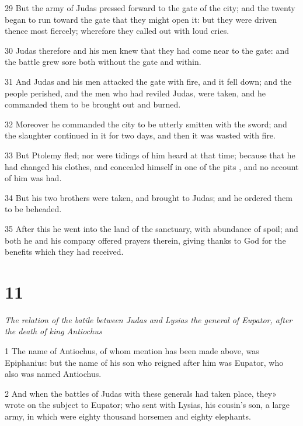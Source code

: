 \par 29 But the army of Judas pressed forward to the gate of the city; and the twenty began to run toward the gate that they might open it: but they were driven thence most fiercely; wherefore they called out with loud cries. 

\par 30 Judas therefore and his men knew that they had come near to the gate: and the battle grew sore both without the gate and within. 

\par 31 And Judas and his men attacked the gate with fire, and it fell down; and the people perished, and the men who had reviled Judas, were taken, and he commanded them to be brought out and burned. 

\par 32 Moreover he commanded the city to be utterly smitten with the sword; and the slaughter continued in it for two days, and then it was wasted with fire. 

\par 33 But Ptolemy fled; nor were tidings of him heard at that time; because that he had changed his clothes, and concealed himself in one of the pits , and no account of him was had. 

\par 34 But his two brothers were taken, and brought to Judas; and he ordered them to be beheaded. 

\par 35 After this he went into the land of the sanctuary, with abundance of spoil; and both he and his company offered prayers therein, giving thanks to God for the benefits which they had received. 


\chapter{11}

\par \textit{The relation of the batile between Judas and Lysias the general of Eupator, after the death of king Antiochus}

\par 1 The name of Antiochus, of whom mention has been made above, was Epiphanius: but the name of his son who reigned after him was Eupator, who also was named Antiochus. 

\par 2 And when the battles of Judas with these generals had taken place, they» wrote on the subject to Eupator; who sent with Lysias, his cousin’s son, a large army, in which were eighty thousand horsemen and eighty elephants. 

